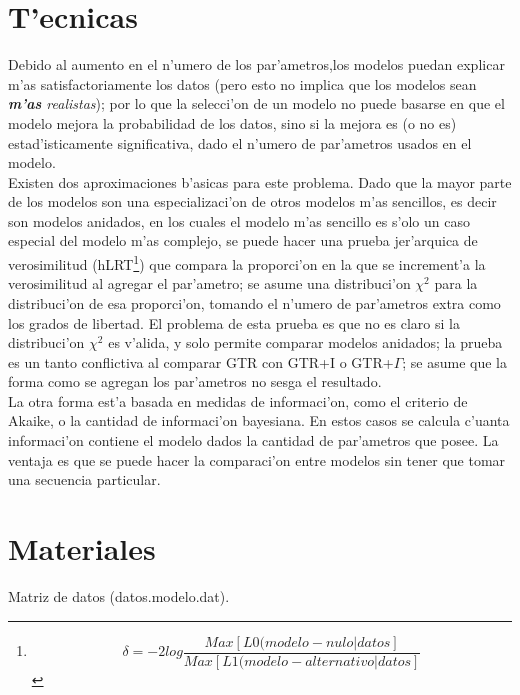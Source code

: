 \section{T'ecnicas}
Debido al aumento en el n'umero de los par'ametros,los modelos puedan explicar m'as satisfactoriamente los datos (pero esto no implica que los modelos sean \emph{\textbf{m'as} realistas}); por lo que la selecci'on de un modelo no puede basarse en que el modelo mejora la probabilidad de los datos, sino si la mejora es (o no es) estad'isticamente significativa, dado el n'umero de par'ametros usados en el modelo.\\
Existen dos aproximaciones b'asicas para este problema. Dado que la mayor parte de los modelos son una especializaci'on de otros modelos m'as sencillos, es decir son modelos anidados, en los cuales el modelo m'as sencillo es s'olo un caso especial del modelo m'as complejo, se puede hacer una prueba jer'arquica de verosimilitud (hLRT\footnote
{\begin{equation}
\delta = -2 log \frac{Max[L0(modelo-nulo|datos]}{Max[L1(modelo-alternativo|datos]} 
\end{equation}
}) que compara la proporci'on en la que se increment'a la verosimilitud al agregar el par'ametro; se asume una distribuci'on $\chi ^2$  para la distribuci'on de esa proporci'on, tomando el n'umero de par'ametros extra como los grados de libertad. El problema de esta prueba es que no es claro si la distribuci'on $\chi ^2$ es v'alida, y solo permite comparar modelos anidados; la prueba  es un tanto conflictiva al comparar GTR con GTR+I o GTR+$\Gamma$; se asume que la forma como se agregan los par'ametros no sesga el resultado.\\
La otra forma est'a basada en medidas de informaci'on, como el criterio de Akaike, o la cantidad de informaci'on bayesiana. En estos casos se calcula c'uanta informaci'on contiene el modelo dados la cantidad de par'ametros que posee. La ventaja es que se puede hacer la comparaci'on entre modelos sin tener que tomar una secuencia particular.
\section{Materiales}
\noindent
Matriz de datos (datos.modelo.dat).
